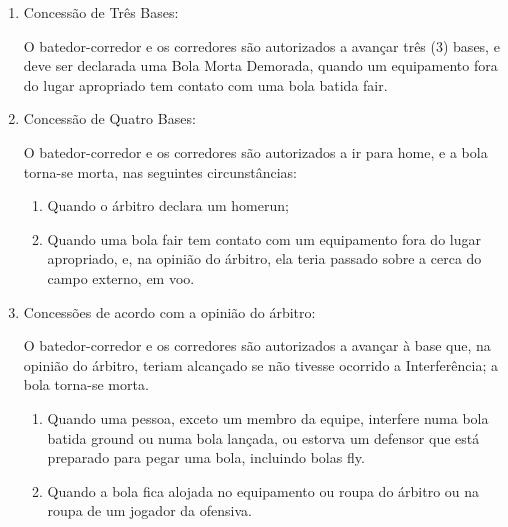 \begin{multicols}{2}
\begin{enumerate}[label=\alph*)]
	\item  Concess\~ao de Tr\^es Bases: 
	
	O batedor-corredor e os corredores s\~ao autorizados a avan\c{c}ar tr\^es (3) bases, e deve ser declarada uma Bola Morta Demorada, quando um equipamento fora do lugar apropriado tem contato com uma bola batida \gls{fair}. 
	
	\item  Concess\~ao de Quatro Bases: 
	
	O batedor-corredor e os corredores s\~ao autorizados a ir para \gls{home}, e a bola torna-se morta, nas seguintes circunst\^ancias: 
	
	\begin{enumerate}[label=\roman* -]
		\item Quando o \'arbitro declara um \gls{homerun}; 
		\item Quando uma bola \gls{fair} tem contato com um equipamento fora do lugar apropriado, e, na opini\~ao do \'arbitro, ela teria passado sobre a cerca do campo externo, em voo. 
	\end{enumerate}
	\item  Concess\~oes de acordo com a opini\~ao do \'arbitro: 
	
	O batedor-corredor e os corredores s\~ao autorizados a avan\c{c}ar \`a base que, na opini\~ao 
	do \'arbitro, teriam alcan\c{c}ado se n\~ao tivesse ocorrido a Interfer\^encia; a bola torna-se morta. 
	\begin{enumerate}[label=\roman*.]
		\item Quando uma pessoa, exceto um membro da equipe, interfere numa bola batida \gls{ground} ou numa bola lan\c{c}ada, ou estorva um defensor que est\'a preparado para pegar uma bola, incluindo bolas \gls{fly}. 
		\item Quando a bola fica alojada no equipamento ou roupa do \'arbitro ou na roupa de um jogador da ofensiva. 
	\end{enumerate}
\end{enumerate}	
\end{multicols}